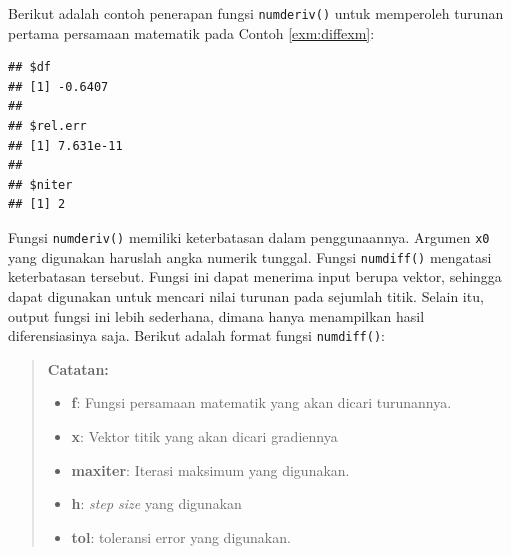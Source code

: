 \documentclass[
]{book}
\newenvironment{Shaded}{\begin{snugshade}}{\end{snugshade}}
\newcommand{\AttributeTok}[1]{\textcolor[rgb]{0.13,0.29,0.53}{#1}}
\newcommand{\ControlFlowTok}[1]{\textcolor[rgb]{0.13,0.29,0.53}{\textbf{#1}}}
\newcommand{\DecValTok}[1]{\textcolor[rgb]{0.00,0.00,0.81}{#1}}
\newcommand{\FunctionTok}[1]{\textcolor[rgb]{0.13,0.29,0.53}{\textbf{#1}}}
\newcommand{\NormalTok}[1]{#1}
\newcommand{\SpecialCharTok}[1]{\textcolor[rgb]{0.81,0.36,0.00}{\textbf{#1}}}
\providecommand{\tightlist}{%
  \setlength{\itemsep}{0pt}\setlength{\parskip}{0pt}}
\theoremstyle{definition}
\theoremstyle{definition}
\theoremstyle{definition}
\theoremstyle{definition}
\theoremstyle{remark}
\begin{document}
Berikut adalah contoh penerapan fungsi \texttt{numderiv()} untuk memperoleh turunan pertama persamaan matematik pada Contoh \ref{exm:diffexm}:

\begin{Shaded}
\end{Shaded}

\begin{verbatim}
## $df
## [1] -0.6407
## 
## $rel.err
## [1] 7.631e-11
## 
## $niter
## [1] 2
\end{verbatim}

Fungsi \texttt{numderiv()} memiliki keterbatasan dalam penggunaannya. Argumen \texttt{x0} yang digunakan haruslah angka numerik tunggal. Fungsi \texttt{numdiff()} mengatasi keterbatasan tersebut. Fungsi ini dapat menerima input berupa vektor, sehingga dapat digunakan untuk mencari nilai turunan pada sejumlah titik. Selain itu, output fungsi ini lebih sederhana, dimana hanya menampilkan hasil diferensiasinya saja. Berikut adalah format fungsi \texttt{numdiff()}:

\begin{Shaded}
\end{Shaded}

\begin{quote}
\textbf{Catatan:}

\begin{itemize}
\tightlist
\item
  \textbf{f}: Fungsi persamaan matematik yang akan dicari turunannya.
\item
  \textbf{x}: Vektor titik yang akan dicari gradiennya
\item
  \textbf{maxiter}: Iterasi maksimum yang digunakan.
\item
  \textbf{h}: \emph{step size} yang digunakan
\item
  \textbf{tol}: toleransi error yang digunakan.
\end{itemize}
\end{quote}
\end{document}
